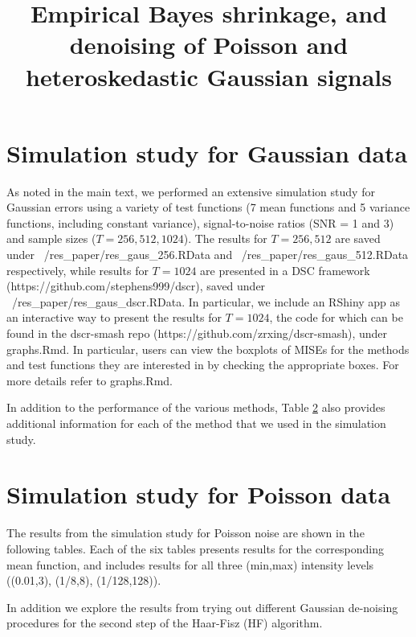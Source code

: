 \documentclass[12pt]{article}
\begin{document}
\title{\textbf{Empirical Bayes shrinkage, and denoising of Poisson and heteroskedastic Gaussian signals}}
\date{}
\maketitle

\section{Simulation study for Gaussian data}
As noted in the main text, we performed an extensive simulation study for Gaussian errors using a variety of test functions (7 mean functions and 5 variance functions, including constant variance), signal-to-noise ratios (SNR = 1 and 3) and sample sizes ($T=256,512,1024$). The results for $T=256,512$ are saved under ~/res_paper/res_gaus_256.RData and ~/res_paper/res_gaus_512.RData respectively, while results for $T=1024$ are presented in a DSC framework (https://github.com/stephens999/dscr), saved under ~/res_paper/res_gaus_dscr.RData. In particular, we include an RShiny app as an interactive way to present the results for $T=1024$, the code for which can be found in the dscr-smash repo (https://github.com/zrxing/dscr-smash), under graphs.Rmd. In particular, users can view the boxplots of MISEs for the methods and test functions they are interested in by checking the appropriate boxes. For more details refer to graphs.Rmd.

In addition to the performance of the various methods, Table \ref{} also provides additional information for each of the method that we used in the simulation study.


\section{Simulation study for Poisson data}
The results from the simulation study for Poisson noise are shown in the following tables. Each of the six tables presents results for the corresponding mean function, and includes results for all three (min,max) intensity levels ((0.01,3), (1/8,8), (1/128,128)).




In addition we explore the results from trying out different Gaussian de-noising procedures for the second step of the Haar-Fisz (HF) algorithm.
\end{document}
